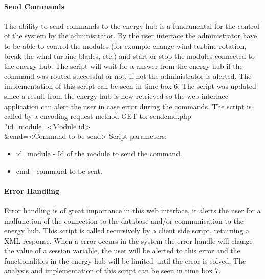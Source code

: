 \paragraph{Send Commands}
The ability to send commands to the energy hub is a fundamental for the control of the system by the administrator. By the user interface the administrator have to be able to control the modules (for example change wind turbine rotation, break the wind turbine blades, etc.) and start or stop the modules connected to the energy hub.
\p
The script will wait for a answer from the energy hub if the command was routed successful or not, if not the administrator is alerted.
\p
The implementation of this script can be seen in time box 6. The script was updated since a result from the energy hub is now retrieved so the web interface application can alert the user in case error during the commands.
\p
The script is called by a encoding request method GET to:
\p
sendcmd.php \\
?id\_module=\textless Module id\textgreater \\
\&cmd=\textless Command to be send\textgreater
\p
Script parameters:
\begin{itemize}
	\item id\_module - Id of the module to send the command.
	\item cmd - command to be sent.
\end{itemize}
\paragraph{Error Handling}
Error handling is of great importance in this web interface, it alerts the user for a malfunction of the connection to the database and/or communication to the energy hub. This script is called recursively by a client side script, returning a XML response. When a error occurs in the system the error handle will change the value of a session variable, the user will be alerted to this error and the functionalities in the energy hub will be limited until the error is solved. The analysis and implementation of this script can be seen in time box 7.
